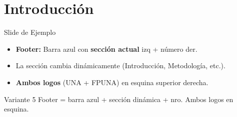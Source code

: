 \documentclass[12pt, aspectratio=169]{beamer}
\begin{document}
\section{Introducci\'on}
\begin{frame}{Slide de Ejemplo}
\begin{itemize}
  \item \textbf{Footer:} Barra azul con \textbf{secci\'on actual} izq + n\'umero der.
  \item La secci\'on cambia din\'amicamente (Introducci\'on, Metodolog\'ia, etc.).
  \item \textbf{Ambos logos} (UNA + FPUNA) en esquina superior derecha.
\end{itemize}
\begin{block}{Variante 5}
  Footer = barra azul + secci\'on din\'amica + nro. Ambos logos en esquina.
\end{block}
\end{frame}
\end{document}
